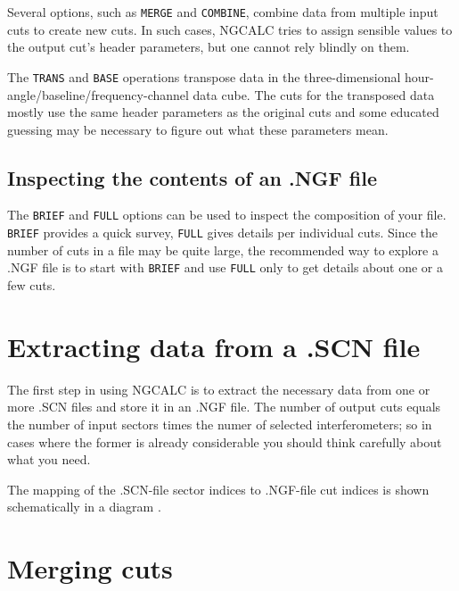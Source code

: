         Several options, such as \verb/MERGE/ and \verb/COMBINE/, combine data
from multiple input cuts to create new cuts. In such cases, NGCALC tries to
assign sensible values to the output cut's header parameters, but one cannot
rely blindly on them.

        The \verb/TRANS/ and \verb/BASE/ operations transpose data in the
three-dimensional hour-angle/baseline/frequency-channel data cube. The cuts for
the transposed data mostly use the same header parameters as the original cuts
and some educated guessing may be necessary to figure out what these parameters
mean. 


\subsection{ Inspecting the contents of an .NGF file} 
\label{.inspect} 

        The \verb/BRIEF/ and \verb/FULL/ options can be used to inspect the
composition of your file. \verb/BRIEF/ provides a quick survey, \verb/FULL/
gives details per individual cuts. Since the number of cuts in a file may be
quite large, the recommended way to explore a .NGF file is to start with 
\verb/BRIEF/ and use \verb/FULL/ only to get details about one or a few cuts. 


\section{ Extracting data from a .SCN file} 
\label{.extract} 

        The first step in using NGCALC is to extract the necessary data from
one or more .SCN files and store it in an .NGF file. The number of output cuts
equals the number of input sectors times the numer of selected interferometers;
so in cases where the former is already considerable you should think carefully
about what you need. 

The mapping of the .SCN-file sector indices to .NGF-file cut indices is shown
schematically in a diagram . 




\section{ Merging cuts}
\label{.merge}


